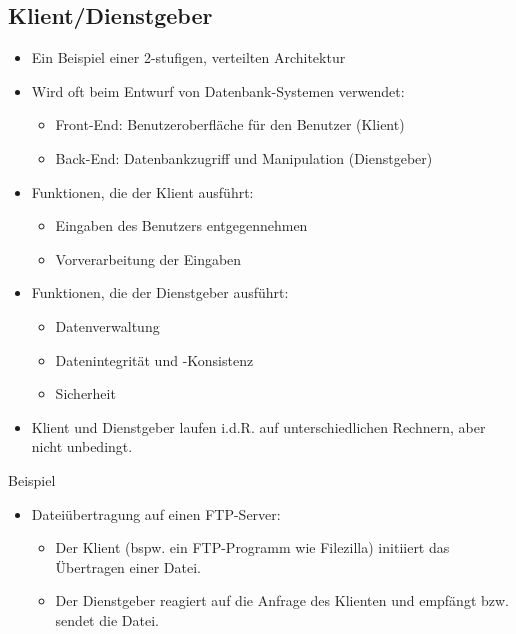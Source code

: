 \newpage

\subsection{Klient/Dienstgeber}

\begin{itemize}
    \item Ein Beispiel einer 2-stufigen, verteilten Architektur
    \item Wird oft beim Entwurf von Datenbank-Systemen verwendet:
    \begin{itemize}
        \item Front-End: Benutzeroberfläche für den Benutzer (Klient)
        \item Back-End: Datenbankzugriff und Manipulation (Dienstgeber)
    \end{itemize}
    \item Funktionen, die der Klient ausführt:
    \begin{itemize}
        \item Eingaben des Benutzers entgegennehmen
        \item Vorverarbeitung der Eingaben
    \end{itemize}
    \item Funktionen, die der Dienstgeber ausführt:
    \begin{itemize}
        \item Datenverwaltung
        \item Datenintegrität und -Konsistenz
        \item Sicherheit
    \end{itemize}
    \item Klient und Dienstgeber laufen i.d.R. auf unterschiedlichen Rechnern, aber nicht unbedingt.
\end{itemize}

Beispiel

\begin{itemize}
    \item Dateiübertragung auf einen FTP-Server:
    \begin{itemize}
        \item Der Klient (bspw. ein FTP-Programm wie Filezilla) initiiert das Übertragen einer Datei.
        \item Der Dienstgeber reagiert auf die Anfrage des Klienten und empfängt bzw. sendet die Datei.
    \end{itemize}
\end{itemize}
\newpage
